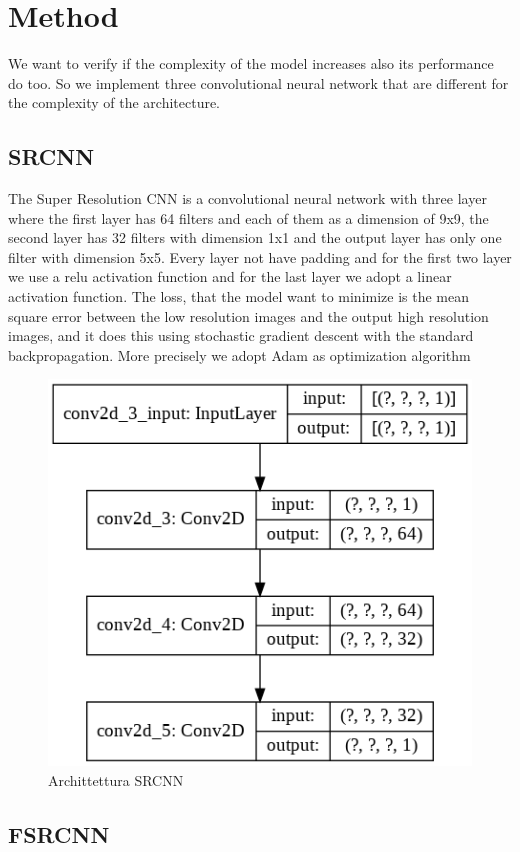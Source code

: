 \documentclass[10pt,twocolumn,letterpaper]{article}
\begin{document}
\section{Method}
We want to verify if the complexity of the model increases also its performance do too. So we implement three convolutional neural network that are different for the complexity of the architecture.
\subsection{SRCNN}
The Super Resolution CNN is a convolutional neural network with three layer where the first layer has 64 filters and each of them as a dimension of 9x9, the second layer has 32 filters with dimension 1x1 and the output layer has only one filter with dimension 5x5. Every layer not have padding and for the first two layer we use a relu activation function and for the last layer we adopt a linear activation function. The loss, that the model want to minimize is the mean square error between the low resolution images and the output high resolution images, and it does this using stochastic gradient descent with the standard backpropagation. More precisely we adopt Adam as optimization algorithm 
\begin{figure}[htp]
    \centering
    \includegraphics[scale=0.4]{img/srcnn.png}
    \caption{Archittettura SRCNN}
\end{figure}
\subsection{FSRCNN}
\end{document}
